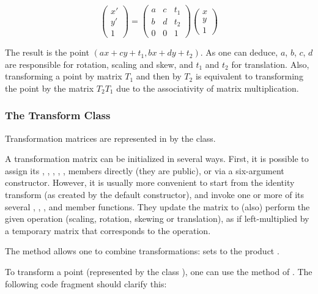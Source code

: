 \begin{pdfonly}
\[ \left( \begin{array}{c} x' \\ y' \\ 1 \end{array} \right)
 = \left( \begin{array}{ccc}
a & c & t_1 \\
b & d & t_2 \\
0 & 0 & 1 \end{array} \right)
\left( \begin{array}{c} x \\ y \\ 1 \end{array} \right)
\]
\end{pdfonly}

The result is the point $(ax+cy+t_1, bx+dy+t_2)$. As one can deduce, $a$,
$b$, $c$, $d$ are responsible for rotation, scaling and skew, and $t_1$ and
$t_2$ for translation. Also, transforming a point by matrix $T_1$ and then by
$T_2$ is equivalent to transforming the point by the matrix $T_2 T_1$ due to
the associativity of matrix multiplication.


\subsubsection{The Transform Class}
\label{sec:graphics:the-transform-class}

Transformation matrices are represented in {\opp} by the 
class.

A  transformation matrix can be initialized in
several ways. First, it is possible to assign its , ,
, , ,  members directly (they are public), or
via a six-argument constructor. However, it is usually more convenient to
start from the identity transform (as created by the default constructor), and
invoke one or more of its several , ,
,  and  member functions.
They update the matrix to (also) perform the given operation (scaling,
rotation, skewing or translation), as if left-multiplied by a temporary
matrix that corresponds to the operation.

The  method allows one to combine transformations:
 sets  to the product .

To transform a point (represented by the class ),
one can use the  method of . The
following code fragment should clarify this:

